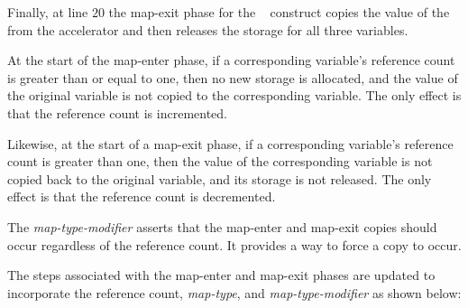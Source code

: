 Finally, at line $20$ the map-exit phase for the ~
construct copies the value of the  from the accelerator and then releases
the storage for all three variables.



At the start of the map-enter phase, if a corresponding variable's
reference count is greater than or equal to one, then no new storage is allocated,
and the value of the original variable is not copied to the corresponding
variable.  The only effect is that the reference count is incremented.

Likewise, at the start of a map-exit phase, if a corresponding variable's
reference count is greater than one, then the value of the corresponding
variable is not copied back to the original variable, and its storage is not
released.  The only effect is that the reference count is decremented.



The  \emph{map-type-modifier} asserts that the map-enter and
map-exit copies should occur regardless of the reference count.  It
provides a way to force a copy to occur.

The steps associated with the map-enter and map-exit phases are updated to
incorporate the reference count, \emph{map-type}, and \emph{map-type-modifier}
as shown below:

